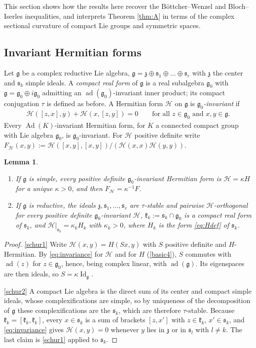 \documentclass[leqno,10pt]{amsart}
\newtheorem{lemma}[theorem]{Lemma}%
\theoremstyle{definition}
\numberwithin{equation}{section}
\newcommand{\kl}{\mathfrak{k}}
\newcommand{\id}{\operatorname{Id}}
\newcommand{\g}{\mathfrak{g}}
\newcommand{\ad}{\operatorname{ad}}
\newcommand{\Ad}{\operatorname{Ad}}
\newcommand{\gz}{\g_{0}}
\newcommand{\HH}{\mathcal H}
\newcommand{\subs}{\mathfrak{s}}
\begin{document}
This section shows how the results here recover the Böttcher--Wenzel and Bloch--Iserles inequalities, and interprets Theorem \ref{thm:A} in terms of the complex sectional curvature of compact Lie groups and symmetric spaces.

\subsection{Invariant Hermitian forms}
Let $\g$ be a complex reductive Lie algebra, $\g = \mathfrak{z}\oplus\subs_{1}\oplus\dots\oplus\subs_{r}$ with $\mathfrak{z}$ the center and $\subs_{k}$ simple ideals. A \emph{compact real form} of $\g$ is a real subalgebra $\gz$ with $\g = \gz \oplus i\gz$ admitting an $\ad(\gz)$-invariant inner product; its compact conjugation $\tau$ is defined as before. A Hermitian form $\HH$ on $\g$ is \emph{$\gz$-invariant} if
\begin{align}\label{eq:invariance}
\HH([z, x], y) + \HH(x, [z, y]) = 0 \qquad \text{for all } z \in \gz \text{ and } x, y \in \g.
\end{align}
Every $\Ad(K)$-invariant Hermitian form, for $K$ a connected compact group with Lie algebra $\gz$, is $\gz$-invariant. For $\HH$ positive definite write $F_{\HH}(x, y) := \HH([x, y], [x, y])/(\HH(x, x)\HH(y, y))$.

\begin{lemma}\label{lem:schur}
\leavevmode\noindent
\begin{enumerate}[label=(\arabic*), ref=(\arabic*)]
\item\label{schur1} If $\g$ is simple, every positive definite $\gz$-invariant Hermitian form is $\HH = \kappa H$ for a unique $\kappa > 0$, and then $F_{\HH} = \kappa^{-1}F$.
\item\label{schur2} If $\g$ is reductive, the ideals $\mathfrak{z}, \subs_{1}, \dots, \subs_{r}$ are $\tau$-stable and pairwise $\HH$-orthogonal for every positive definite $\gz$-invariant $\HH$, $\kl_{k} := \subs_{k} \cap \gz$ is a compact real form of $\subs_{k}$, and $\HH|_{\subs_{k}} = \kappa_{k}H_{k}$ with $\kappa_{k} > 0$, where $H_{k}$ is the form \eqref{eq:Hdef} of $\subs_{k}$.
\end{enumerate}
\end{lemma}
\begin{proof}
\ref{schur1} Write $\HH(x, y) = H(Sx, y)$ with $S$ positive definite and $H$-Hermitian. By \eqref{eq:invariance} for $\HH$ and for $H$ (\eqref{basic4}), $S$ commutes with $\ad(z)$ for $z \in \gz$, hence, being complex linear, with $\ad(\g)$. Its eigenspaces are then ideals, so $S = \kappa\id_{\g}$.

\ref{schur2} A compact Lie algebra is the direct sum of its center and compact simple ideals, whose complexifications are simple, so by uniqueness of the decomposition of $\g$ these complexifications are the $\subs_{k}$, which are therefore $\tau$-stable. Because $\kl_{k} = [\kl_{k}, \kl_{k}]$, every $x \in \subs_{k}$ is a sum of brackets $[z, x']$ with $z \in \kl_{k}$, $x' \in \subs_{k}$, and \eqref{eq:invariance} gives $\HH(x, y) = 0$ whenever $y$ lies in $\mathfrak{z}$ or in $\subs_{l}$ with $l \neq k$. The last claim is \ref{schur1} applied to $\subs_{k}$.
\end{proof}
\end{document}

